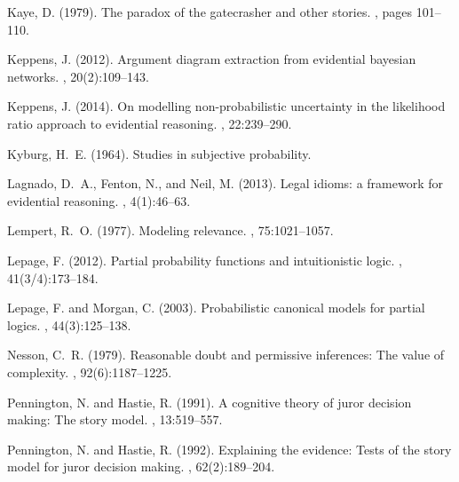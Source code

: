 \documentclass[10pt,leqno]{article}
\begin{document}
\begin{thebibliography}{}
Kaye, D. (1979).
\newblock The paradox of the gatecrasher and other stories.
, pages 101--110.

Keppens, J. (2012).
\newblock Argument diagram extraction from evidential bayesian networks.
, 20(2):109--143.

Keppens, J. (2014).
\newblock On modelling non-probabilistic uncertainty in the likelihood ratio
  approach to evidential reasoning.
, 22:239--290.

Kyburg, H.~E. (1964).
\newblock Studies in subjective probability.

Lagnado, D.~A., Fenton, N., and Neil, M. (2013).
\newblock Legal idioms: a framework for evidential reasoning.
, 4(1):46--63.

Lempert, R.~O. (1977).
\newblock Modeling relevance.
, 75:1021--1057.

Lepage, F. (2012).
\newblock Partial probability functions and intuitionistic logic.
, 41(3/4):173--184.

Lepage, F. and Morgan, C. (2003).
\newblock Probabilistic canonical models for partial logics.
, 44(3):125--138.

Nesson, C.~R. (1979).
\newblock Reasonable doubt and permissive inferences: The value of complexity.
, 92(6):1187--1225.

Pennington, N. and Hastie, R. (1991).
\newblock A cognitive theory of juror decision making: The story model.
, 13:519--557.

Pennington, N. and Hastie, R. (1992).
\newblock Explaining the evidence: Tests of the story model for juror decision
  making.
, 62(2):189--204.


\end{thebibliography}
\end{document}

